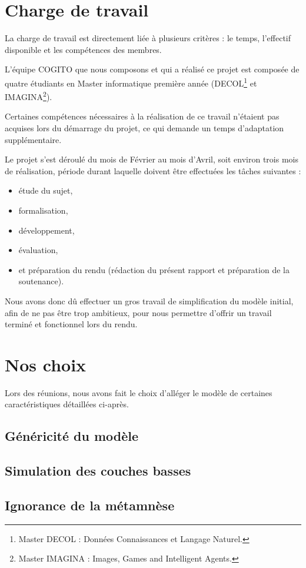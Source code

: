 \section{Charge de travail}
La charge de travail est directement liée à plusieurs critères : le temps,
l'effectif disponible et les compétences des membres.

L'équipe COGITO que nous composons et qui a réalisé ce projet est composée de
quatre étudiants en Master informatique première année (DECOL\footnote{Master
DECOL : Données Connaissances et Langage Naturel.} et IMAGINA\footnote{Master
IMAGINA : Images, Games and Intelligent Agents.}).

Certaines compétences nécessaires à la réalisation de ce travail n'étaient pas
acquises lors du démarrage du projet, ce qui demande un temps d'adaptation
supplémentaire.

Le projet s'est déroulé du mois de Février au mois d'Avril, soit environ trois
mois de réalisation, période durant laquelle doivent être effectuées les tâches
suivantes :

\begin{itemize}
\item étude du sujet, 
\item formalisation, 
\item développement, 
\item évaluation,
\item et préparation du rendu (rédaction du présent rapport et préparation de la soutenance).
\end{itemize}

Nous avons donc dû effectuer un gros travail de simplification du modèle
initial, afin de ne pas être trop ambitieux, pour nous permettre d'offrir un
travail terminé et fonctionnel lors du rendu.

\section{Nos choix}

Lors des réunions, nous avons fait le choix d'alléger le modèle de certaines caractéristiques détaillées ci-après.

\subsection{Généricité du modèle}
\subsection{Simulation des couches basses}
\subsection{Ignorance de la métamnèse}
